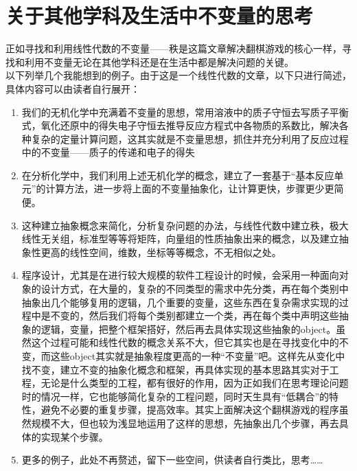 \documentclass[UTF-8,a4paper]{ctexart}
\begin{document}
\part{关于其他学科及生活中不变量的思考}
    正如寻找和利用线性代数的不变量——秩是这篇文章解决翻棋游戏的核心一样，寻找和利用不变量无论在其他学科还是在生活中都是解决问题的关键。
    \\以下列举几个我能想到的例子。由于这是一个线性代数的文章，以下只进行简述，具体内容可以由读者自行展开：
    \kaishu
    \begin{enumerate}
        \item 我们的无机化学中充满着不变量的思想，常用溶液中的质子守恒去写质子平衡式，氧化还原中的得失电子守恒去推导反应方程式中各物质的系数比，解决各种复杂的定量计算问题，这其实就是不变量思想，抓住并充分利用了反应过程中的不变量——质子的传递和电子的得失
        \item 在分析化学中，我们利用上述无机化学的概念，建立了一套基于“基本反应单元”的计算方法，进一步将上面的不变量抽象化，让计算更快，步骤更少更简便。
        \item 这种建立抽象概念来简化，分析复杂问题的办法，与线性代数中建立秩，极大线性无关组，标准型等等将矩阵，向量组的性质抽象出来的概念，以及建立抽象性更高的线性空间，维数，坐标等等概念，不无相似之处。
        \item 程序设计，尤其是在进行较大规模的软件工程设计的时候，会采用一种面向对象的设计方式，在大量的，复杂的不同类型的需求中先分类，再在每个类别中抽象出几个能够复用的逻辑，几个重要的变量，这些东西在复杂需求实现的过程中是不变的，然后我们将每个类别都建立一个类，再在每个类中声明这些抽象的逻辑，变量，把整个框架搭好，然后再去具体实现这些抽象的object。虽然这个过程可能和线性代数的概念关系不大，但它其实也是在寻找变化中的不变，而这些object其实就是抽象程度更高的一种“不变量”吧。这样先从变化中找不变，建立不变的抽象化概念和框架，再具体实现的基本思路其实对于工程，无论是什么类型的工程，都有很好的作用，因为正如我们在思考理论问题时的情况一样，它也能够简化复杂的工程问题，同时天生具有“低耦合”的特性，避免不必要的重复步骤，提高效率。其实上面解决这个翻棋游戏的程序虽然规模不大，但也较为浅显地运用了这样的思想，先抽象出几个步骤，再去具体的实现某个步骤。
        \item 更多的例子，此处不再赘述，留下一些空间，供读者自行类比，思考……
    \end{enumerate}
\end{document}
